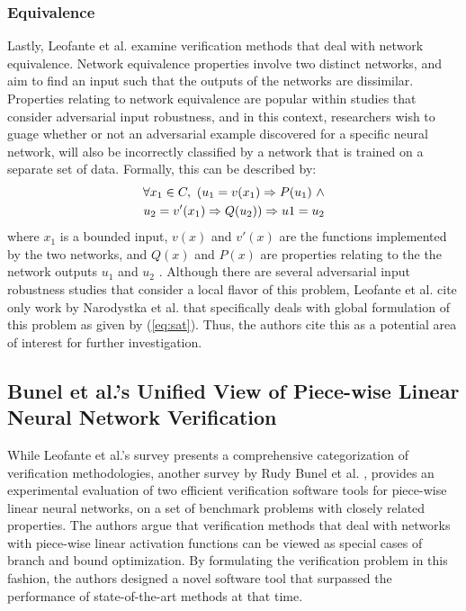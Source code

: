 \documentclass[10pt,conference]{IEEEtran}
\begin{document}
\subsubsection{Equivalence}
Lastly, Leofante et al. examine verification methods that deal with network equivalence. Network equivalence properties involve two distinct networks, and aim to find an input such that the outputs of the networks are dissimilar. Properties relating to network equivalence are popular within studies that consider adversarial input robustness, and in this context, researchers wish to guage whether or not an adversarial example discovered for a specific neural network, will also be incorrectly classified by a network that is trained on a separate set of data. Formally, this can be described by:
\begin{align}
    \forall x_1 \in C, \ (u_1=v(x_1) \Rightarrow P(u_1) \ \wedge \\ u_2=v'(x_1) \Rightarrow Q(u_2)) \Rightarrow u1=u_2 \label{eq:sat} \notag  
\end{align}
where $x_1$ is a bounded input, $v(x)$ and $v'(x)$ are the functions implemented by the two networks, and $Q(x)$ and $P(x)$ are properties relating to the the network outputs $u_1$ and $u_2$ \cite{LeofanteAdvances2018}. Although there are several adversarial input robustness studies that consider a local flavor of this problem, Leofante et al. cite only work by Narodystka et al. \cite{NarodytskaVerifying2017} that specifically deals with global formulation of this problem as given by (\ref{eq:sat}). Thus, the authors cite this as a potential area of interest for further investigation.
\subsection{Bunel et al.'s Unified View of Piece-wise Linear Neural Network Verification}
While Leofante et al.'s survey presents a comprehensive categorization of verification methodologies, another survey by Rudy Bunel et al. \cite{BunelPiecewise2017}, provides an experimental evaluation of two efficient verification software tools for piece-wise linear neural networks, on a set of benchmark problems with closely related properties. The authors argue that verification methods that deal with networks with piece-wise linear activation functions can be viewed as special cases of branch and bound optimization. By formulating the verification problem in this fashion, the authors designed a novel software tool that surpassed the performance of state-of-the-art methods at that time.
\end{document}
